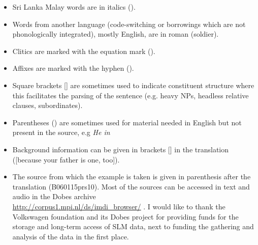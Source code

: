 \begin{itemize}
 \item Sri Lanka Malay words are in italics ().
 \item Words from another language (code-switching or borrowings which are not phonologically integrated), mostly English, are in roman (soldier).
 \item Clitics are marked with the equation mark ().
 \item Affixes are marked with the hyphen ().
 \item Square brackets [] are sometimes used to indicate constituent structure where this facilitates the parsing of the sentence (e.g. heavy NPs, headless relative clauses, subordinates).
 \item Parentheses () are sometimes used for material needed in English but not present in the source, e.g \em He \em in 
 \item Background information can be given in brackets [] in the translation ([because your father is one, too]).
 \item The source from which the example is taken is given in parenthesis after the translation (B060115prs10). Most of the sources can be accessed in text and audio in the Dobes archive\\ \url{http://corpus1.mpi.nl/ds/imdi\_browser/} . I would like to thank the Volkswagen foundation and its Dobes project for providing funds for the storage and long-term access of SLM data, next to funding the gathering and analysis of the data in the first place.
\end{itemize}

                                                                                                                                                                                                                                                                                                                                                                                                                                                                                                                                                   